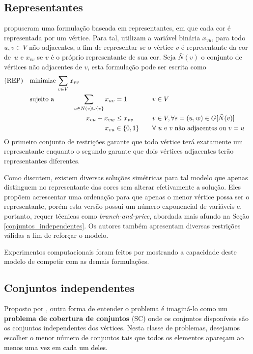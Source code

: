 \documentclass[11pt]{article}
\begin{document}
\subsection{Representantes}
\label{sec:orge2b6344}
\textcite{Campelo2004CliquesHolesVertex} propuseram uma formulação baseada em representantes, em que cada cor é representada por um vértice.
Para tal, utilizam a variável binária \(x_{vu}\), para todo \(u, v \in V\) não adjacentes, a fim de representar se o vértice \(v\) é representante da cor de~\(u\) e \(x_{vv}\) se \(v\) é o próprio representante de sua cor.
Seja \(\bar{N}(v)\) o conjunto de vértices não adjacentes de \(v\), esta formulação pode ser escrita como
\begin{alignat*}{4}
\mathrm{(REP)} \quad & \omit\rlap{minimize  $\displaystyle \sum_{v \in V} x_{vv}$} \\
& \mbox{sujeito a}&& \quad & \sum_{u \in \bar{N}(v) \cup \{v\}} x_{uv}&= 1        & \quad & v \in V \\
&                 &&   & x_{vu} + x_{vw}    & \leq x_{vv} &   & v \in V, \forall e = (u,w) \in G[\bar{N}(v)] \\
&                 &&   & x_{vu}       & \in \{0,1\} &   & \forall \text{ $u$ e $v$ não adjacentes ou $v = u$}
\end{alignat*}
O primeiro conjunto de restrições garante que todo vértice terá exatamente um representante enquanto o segundo garante que dois vértices adjacentes terão representantes diferentes.

Como \textcite{Campelo2008AsymmetricRepresentativesFormulation} discutem, existem diversas soluções simétricas para tal modelo que apenas distinguem no representante das cores sem alterar efetivamente a solução.
Eles propõem acrescentar uma ordenação para que apenas o menor vértice possa ser o representante, porém esta versão possui um número exponencial de variáveis e, portanto, requer técnicas como \emph{branch-and-price}, abordada mais afundo na Seção \ref{conjuntos_independentes}.
Os autores também apresentam diversas restrições válidas a fim de reforçar o modelo.

Experimentos computacionais foram feitos por \textcite{Jabrayilov2018NewIntegerLinear} mostrando a capacidade deste modelo de competir com as demais formulações.

\subsection{Conjuntos independentes}
\label{sec:orgd83cdd5}
\label{conjuntos_independentes}
Proposto por \textcite{Mehrotra1996ColumnGenerationApproach}, outra forma de entender o problema é imaginá-lo como um \textbf{problema de cobertura de conjuntos} (SC) onde os conjuntos disponíveis são os conjuntos independentes dos vértices.
Nesta classe de problemas, desejamos escolher o menor número de conjuntos tais que todos os elementos apareçam ao menos uma vez em cada um deles.
\end{document}
